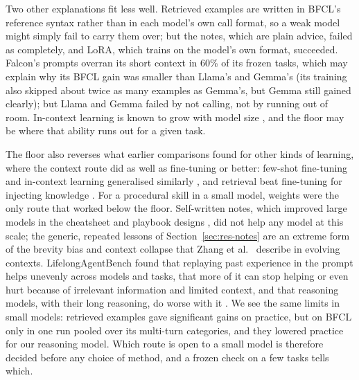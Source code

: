\documentclass[a4paper,fleqn]{cas-dc}
\begin{document}
Two other explanations fit less well. Retrieved examples are written in BFCL's reference syntax rather than in each
model's own call format, so a weak model might simply fail to carry them over; but the notes, which are plain advice,
failed as completely, and LoRA, which trains on the model's own format, succeeded. Falcon's prompts overran its short
context in 60\% of its frozen tasks, which may explain why its BFCL gain was smaller than Llama's and Gemma's (its
training also skipped about twice as many examples as Gemma's, but Gemma still gained clearly); but Llama and Gemma failed by not
calling, not by running out of room. In-context learning is known to grow with model size \citep{brown2020language},
and the floor may be where that ability runs out for a given task.

The floor also reverses what earlier comparisons found for other kinds of learning, where the context route did as well as
fine-tuning or better: few-shot fine-tuning and in-context learning generalised similarly \citep{mosbach2023few}, and
retrieval beat fine-tuning for injecting knowledge \citep{ovadia2024fine,soudani2024fine}. For a procedural skill in a
small model, weights were the only route that worked below the floor. Self-written notes, which improved large models in
the cheatsheet and playbook designs \citep{suzgun2026dynamic,zhang2026agentic}, did not help any model at this scale; the
generic, repeated lessons of Section~\ref{sec:res-notes} are an extreme form of the brevity bias and context collapse
that Zhang et al.~\citep{zhang2026agentic} describe in evolving contexts. LifelongAgentBench found that replaying past
experience in the prompt helps unevenly across models and tasks, that more of it can stop helping or even hurt because
of irrelevant information and limited context, and that reasoning models, with their long reasoning, do worse with it
\citep{zheng2025lifelongagentbench}. We see the same limits in small models: retrieved examples gave significant gains
on practice, but on BFCL only in one run pooled over its multi-turn categories, and they lowered practice for our
reasoning model. Which route is open to a small model is
therefore decided before any choice of method, and a frozen check on a few tasks tells which.
\end{document}
